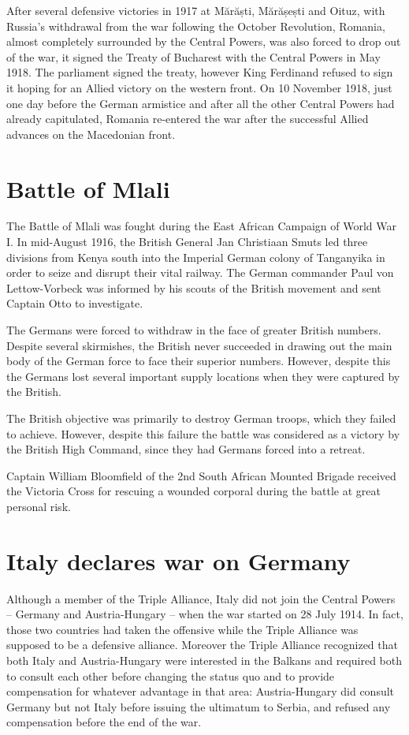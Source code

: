 \documentclass[a4paper,]{book}
\begin{document}
After several defensive victories in 1917 at Mărăști, Mărășești and Oituz, with Russia's withdrawal from the war following the October Revolution, Romania, almost completely surrounded by the Central Powers, was also forced to drop out of the war, it signed the Treaty of Bucharest with the Central Powers in May 1918. The parliament signed the treaty, however King Ferdinand refused to sign it hoping for an Allied victory on the western front. On 10 November 1918, just one day before the German armistice and after all the other Central Powers had already capitulated, Romania re-entered the war after the successful Allied advances on the Macedonian front. 

\section{Battle of Mlali}

The Battle of Mlali was fought during the East African Campaign of World War I. In mid-August 1916, the British General Jan Christiaan Smuts led three divisions from Kenya south into the Imperial German colony of Tanganyika in order to seize and disrupt their vital railway. The German commander Paul von Lettow-Vorbeck was informed by his scouts of the British movement and sent Captain Otto to investigate.

The Germans were forced to withdraw in the face of greater British numbers. Despite several skirmishes, the British never succeeded in drawing out the main body of the German force to face their superior numbers. However, despite this the Germans lost several important supply locations when they were captured by the British.

The British objective was primarily to destroy German troops, which they failed to achieve. However, despite this failure the battle was considered as a victory by the British High Command, since they had Germans forced into a retreat.

Captain William Bloomfield of the 2nd South African Mounted Brigade received the Victoria Cross for rescuing a wounded corporal during the battle at great personal risk. 

\section{Italy declares war on Germany}

Although a member of the Triple Alliance, Italy did not join the Central Powers – Germany and Austria-Hungary – when the war started on 28 July 1914. In fact, those two countries had taken the offensive while the Triple Alliance was supposed to be a defensive alliance. Moreover the Triple Alliance recognized that both Italy and Austria-Hungary were interested in the Balkans and required both to consult each other before changing the status quo and to provide compensation for whatever advantage in that area: Austria-Hungary did consult Germany but not Italy before issuing the ultimatum to Serbia, and refused any compensation before the end of the war.
\end{document}
